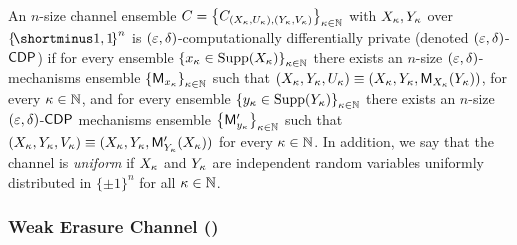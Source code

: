 \begin{definition}\label{def:CDPChannel}
	An $n$-size channel ensemble $C = \set{C_{(X_\pk, U_\pk),(Y_\pk, V_\pk)}}_{\pk\in\N}$ with $X_\kappa, Y_\kappa$ over $\oo^n$ 
	is {\sf$(\varepsilon,\delta)$-computationally differentially private} (denoted $(\varepsilon,\delta)$-${\sf CDP}$) if for every ensemble $\set{x_\pk \in \Supp(X_\pk)}_{\pk\in\N}$ there exists an $n$-size $(\varepsilon,\delta)$-\CDP mechanisms ensemble $\set{\Mc_{x_\pk}}_{\pk\in\N}$ such that $(X_\kappa,Y_\kappa,U_\kappa) \equiv (X_\kappa,Y_\kappa,\mathsf{M}_{X_\kappa}(Y_\kappa))$, for every $\kappa\in{\mathbb{N}}$, and for every ensemble $\set{y_\pk \in \Supp(Y_\pk)}_{\pk\in\N}$ there exists an $n$-size $(\varepsilon,\delta)$-${\sf CDP}$ mechanisms ensemble $\set{\Mc'_{y_\pk}}_{\pk\in\N}$ such that $(X_\kappa,Y_\kappa,V_\kappa) \equiv (X_\kappa,Y_\kappa,\mathsf{M}_{Y_\kappa}'(X_\kappa))$ for every $\kappa\in {\mathbb{N}}$. In addition, we say that the channel is \emph{uniform} if $X_\kappa$ and $Y_\kappa$ are independent random variables uniformly distributed in $\{\pm 1\}^n$ for all $\kappa\in{\mathbb{N}}$.
\end{definition}









\subsubsection{Weak Erasure Channel (\WEC)}

